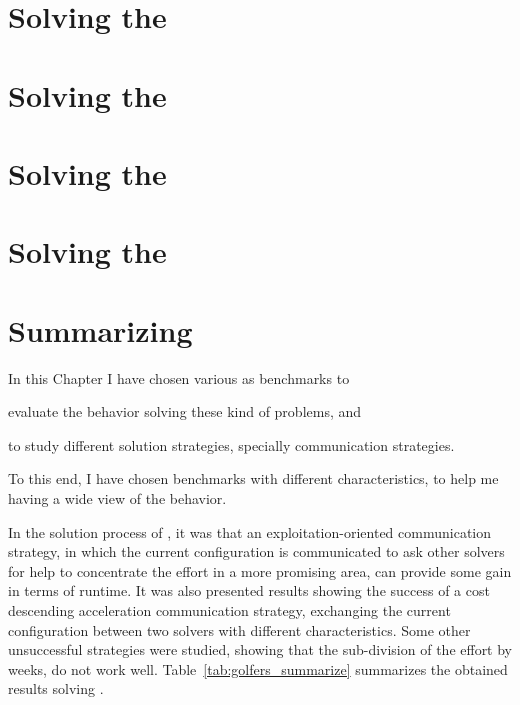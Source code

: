 
\section{Solving the \sgp}
\label{sec:golfers}



\section{Solving the \nqp}
\label{sec:nqueens}



\section{Solving the \carrp}
\label{sec:costas}



\section{Solving the \grp}
\label{sec:golomb}



\section{Summarizing}

In this Chapter I have chosen various \CSPs{} as benchmarks to \begin{inparaenum}[1.] \item evaluate the \posl{} behavior solving these kind of problems, and \item to study different solution strategies, specially communication strategies.\end{inparaenum} To this end, I have chosen benchmarks with different characteristics, to help me having a wide view of the \posl{} behavior.

In the solution process of \sgp{}, it was that an exploitation-oriented communication strategy, in which the current configuration is communicated to ask other solvers for help to concentrate the effort in a more promising area, can provide some gain in terms of runtime. It was also presented results showing the success of a cost descending acceleration communication strategy, exchanging the current configuration between two solvers with different characteristics. Some other unsuccessful strategies were studied, showing that the sub-division of the effort by weeks, do not work well. Table~\ref{tab:golfers_summarize} summarizes the obtained results solving \SGP. 

